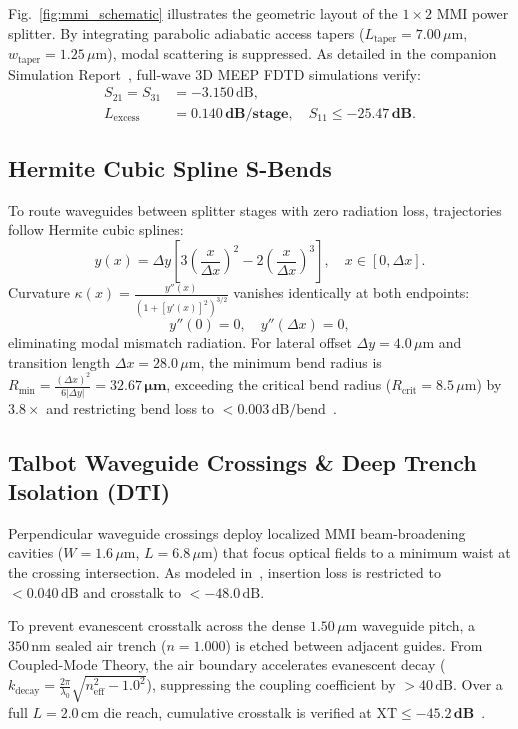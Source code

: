 \documentclass[journal]{IEEEtran}
\begin{document}
Fig.~\ref{fig:mmi_schematic} illustrates the geometric layout of the $1 \times 2$ MMI power splitter. By integrating parabolic adiabatic access tapers ($L_{\text{taper}} = 7.00\,\mu\text{m}$, $w_{\text{taper}} = 1.25\,\mu\text{m}$), modal scattering is suppressed. As detailed in the companion Simulation Report~\cite{omi_sim_report}, full-wave 3D MEEP FDTD simulations verify:
\begin{align}
    S_{21} = S_{31} &= -3.150\,\text{dB}, \\
    L_{\text{excess}} &= \mathbf{0.140\,\text{dB/stage}}, \quad S_{11} \le \mathbf{-25.47\,\text{dB}}.
\end{align}

\subsection{Hermite Cubic Spline S-Bends}
To route waveguides between splitter stages with zero radiation loss, trajectories follow Hermite cubic splines:
\begin{equation}
    y(x) = \Delta y \left[ 3 \left(\frac{x}{\Delta x}\right)^2 - 2 \left(\frac{x}{\Delta x}\right)^3 \right], \quad x \in [0, \Delta x].
\end{equation}
Curvature $\kappa(x) = \frac{y''(x)}{(1 + [y'(x)]^2)^{3/2}}$ vanishes identically at both endpoints:
\begin{equation}
    y''(0) = 0, \quad y''(\Delta x) = 0,
\end{equation}
eliminating modal mismatch radiation. For lateral offset $\Delta y = 4.0\,\mu\text{m}$ and transition length $\Delta x = 28.0\,\mu\text{m}$, the minimum bend radius is $R_{\min} = \frac{(\Delta x)^2}{6 |\Delta y|} = \mathbf{32.67\,\mu\text{m}}$, exceeding the critical bend radius ($R_{\text{crit}} = 8.5\,\mu\text{m}$) by $3.8\times$ and restricting bend loss to $<0.003\,\text{dB/bend}$~\cite{omi_sim_report}.

\subsection{Talbot Waveguide Crossings \& Deep Trench Isolation (DTI)}
Perpendicular waveguide crossings deploy localized MMI beam-broadening cavities ($W = 1.6\,\mu\text{m}$, $L = 6.8\,\mu\text{m}$) that focus optical fields to a minimum waist at the crossing intersection. As modeled in~\cite{omi_sim_report}, insertion loss is restricted to $<0.040\,\text{dB}$ and crosstalk to $<-48.0\,\text{dB}$.

To prevent evanescent crosstalk across the dense $1.50\,\mu\text{m}$ waveguide pitch, a $350\,\text{nm}$ sealed air trench ($n = 1.000$) is etched between adjacent guides. From Coupled-Mode Theory, the air boundary accelerates evanescent decay ($k_{\text{decay}} = \frac{2\pi}{\lambda_0}\sqrt{n_{\text{eff}}^2 - 1.0^2}$), suppressing the coupling coefficient by $>40\,\text{dB}$. Over a full $L = 2.0\,\text{cm}$ die reach, cumulative crosstalk is verified at $\text{XT} \le \mathbf{-45.2\,\text{dB}}$~\cite{omi_sim_report}.
\end{document}
